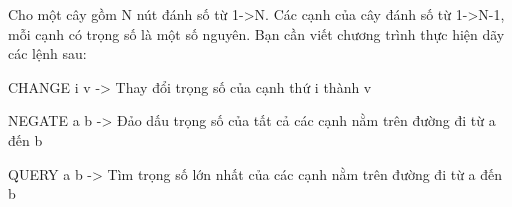 Cho một cây gồm N nút đánh số từ 1->N. Các cạnh của cây đánh số từ 1->N-1, mỗi cạnh có trọng số là một số nguyên. Bạn cần viết chương trình thực hiện dãy các lệnh sau:   


   CHANGE i v -> Thay đổi trọng số của cạnh thứ i thành v   


   NEGATE a b -> Đảo dấu trọng số của tất cả các cạnh nằm trên đường đi từ a đến b   


   QUERY a b -> Tìm trọng số lớn nhất của các cạnh nằm trên đường đi từ a đến b
